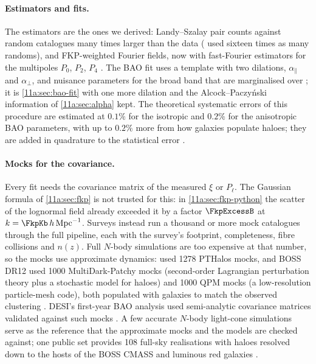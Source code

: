 \paragraph{Estimators and fits.}
The estimators are the ones we derived: Landy--Szalay pair counts against random
catalogues many times larger than the data (\cite{Eisenstein2005} used sixteen
times as many randoms), and FKP-weighted Fourier fields, now with fast-Fourier
estimators for the multipoles $P_0$, $P_2$, $P_4$ . The BAO
fit uses a template with two dilations, $\alpha_\parallel$ and $\alpha_\perp$,
and nuisance parameters for the broad band that are marginalised over
; it is \cref{11a:sec:bao-fit} with one more dilation and
the Alcock--Paczy\'nski information of \cref{11a:sec:alpha} kept. The
theoretical systematic errors of this procedure are estimated at $0.1\%$ for the
isotropic and $0.2\%$ for the anisotropic BAO parameters, with up to $0.2\%$ more
from how galaxies populate haloes; they are added in quadrature to the
statistical error .

\paragraph{Mocks for the covariance.}
Every fit needs the covariance matrix of the measured $\xi$ or $P_\ell$. The
Gaussian formula of \cref{11a:sec:fkp} is not trusted for this: in
\cref{11a:sec:fkp-python} the scatter of the lognormal field already exceeded it by
a factor $\FkpExcessB$ at $k=\FkpKb\,h\,\mathrm{Mpc}^{-1}$. Surveys instead run a
thousand or more mock catalogues through the full pipeline, each with the
survey's footprint, completeness, fibre collisions and $n(z)$. Full $N$-body
simulations are too expensive at that number, so the mocks use approximate
dynamics: \citeauthor{Eisenstein2005} used 1278 PTHalos mocks, and BOSS DR12
used 1000 MultiDark-Patchy mocks (second-order Lagrangian perturbation theory
plus a stochastic model for haloes) and 1000 QPM mocks (a low-resolution
particle-mesh code), both populated with galaxies to match the observed
clustering . DESI's first-year BAO analysis used
semi-analytic covariance matrices validated against such mocks
. A few accurate $N$-body light-cone simulations
serve as the reference that the approximate mocks and the models are checked
against; one public set provides 108 full-sky realisations with haloes resolved
down to the hosts of the BOSS CMASS and luminous red galaxies
\cite{Takahashi2017sims}.

